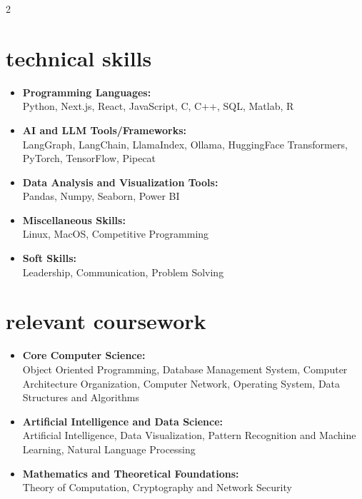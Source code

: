 \documentclass[a4paper,11pt]{article}
\newcommand{\resumeItem}[2]{
  \item{
    \textbf{#1}{\hspace{0.5mm}#2 \vspace{-0.5mm}}
  }
}
\newcommand{\resumeSubItem}[2]{\resumeItem{#1}{#2}\vspace{-4pt}}
\newcommand{\resumeHeadingSkillStart}{\begin{itemize}[leftmargin=*,itemsep=1.7mm, rightmargin=2ex]}
\newcommand{\resumeHeadingSkillEnd}{\end{itemize}\vspace{-2mm}}
\begin{document}
{\small
\begin{multicols}{2}
\section{\textbf{technical skills}}
\vspace{1mm}
 \resumeHeadingSkillStart
  \resumeSubItem{Programming Languages:\\}
    {Python, Next.js, React, JavaScript, C, C++, SQL, Matlab, R}
  \resumeSubItem{AI and LLM Tools/Frameworks:\\}
    {LangGraph, LangChain, LlamaIndex, Ollama, HuggingFace Transformers, PyTorch, TensorFlow, Pipecat}
  \resumeSubItem{Data Analysis and Visualization Tools:\\}
    {Pandas, Numpy, Seaborn, Power BI}
  \resumeSubItem{Miscellaneous Skills:\\}
    {Linux, MacOS, Competitive Programming}
  \resumeSubItem{Soft Skills:\\}
    {Leadership, Communication, Problem Solving}
 \resumeHeadingSkillEnd

\section{\textbf{relevant coursework}}
\vspace{1mm}
\resumeHeadingSkillStart
  \resumeSubItem{Core Computer Science:\\}
    {Object Oriented Programming, Database Management System, Computer Architecture Organization, Computer Network, Operating System, Data Structures and Algorithms}
  \resumeSubItem{Artificial Intelligence and Data Science:\\}
    {Artificial Intelligence, Data Visualization, Pattern Recognition and Machine Learning, Natural Language Processing}
  \resumeSubItem{Mathematics and Theoretical Foundations:\\}
    {Theory of Computation, Cryptography and Network Security}
\resumeHeadingSkillEnd
\end{multicols}
}


\vspace{-1mm}

\end{document}
